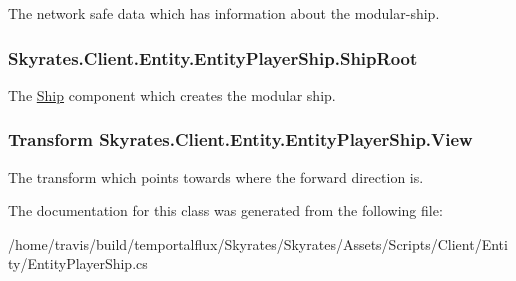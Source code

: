The network safe data which has information about the modular-\/ship. 

\hypertarget{class_skyrates_1_1_client_1_1_entity_1_1_entity_player_ship_ae5ebbb9645fe1bd175dc76bd5ae3b9a0}{
\subsubsection[{Ship\-Root}]{ Skyrates.\-Client.\-Entity.\-Entity\-Player\-Ship.\-Ship\-Root}}\label{class_skyrates_1_1_client_1_1_entity_1_1_entity_player_ship_ae5ebbb9645fe1bd175dc76bd5ae3b9a0}


The \hyperlink{namespace_skyrates_1_1_client_1_1_ship}{Ship} component which creates the modular ship. 

\hypertarget{class_skyrates_1_1_client_1_1_entity_1_1_entity_player_ship_ac31bf5882f6a5c6f53948bde1d9f0913}{
\subsubsection[{View}]{\setlength{\rightskip}{0pt plus 5cm}Transform Skyrates.\-Client.\-Entity.\-Entity\-Player\-Ship.\-View}}\label{class_skyrates_1_1_client_1_1_entity_1_1_entity_player_ship_ac31bf5882f6a5c6f53948bde1d9f0913}


The transform which points towards where the forward direction is. 



The documentation for this class was generated from the following file\-:\begin{DoxyCompactItemize}
\item 
/home/travis/build/temportalflux/\-Skyrates/\-Skyrates/\-Assets/\-Scripts/\-Client/\-Entity/Entity\-Player\-Ship.\-cs\end{DoxyCompactItemize}
